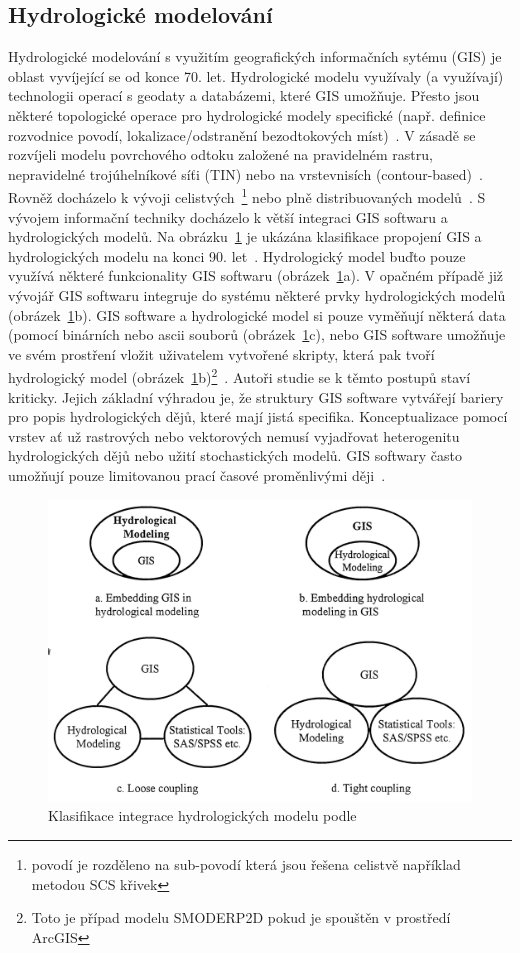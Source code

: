 \subsection*{Hydrologické modelování}
Hydrologické modelování s využitím geografických informačních sytému (GIS) je oblast vyvíjející se od konce 70. let. Hydrologické modelu využívaly (a využívají) technologii operací s geodaty a databázemi, které GIS umožňuje. Přesto jsou některé topologické operace pro hydrologické modely specifické (např. definice rozvodnice povodí, lokalizace/odstranění bezodtokových míst)~\citep{devantier1993}. V zásadě se rozvíjeli modelu povrchového odtoku založené na pravidelném rastru, nepravidelné trojúhelníkové síťi (TIN) nebo na vrstevnisích (contour-based)~\citep{devantier1993}. Rovněž docházelo k vývoji celistvých~\footnote{povodí je rozděleno na sub-povodí která jsou řešena celistvě například metodou SCS křivek} nebo plně distribuovaných modelů~\citep{devantier1993}. S vývojem informační techniky docházelo k větší integraci GIS softwaru a hydrologických modelů. Na obrázku~\ref{fig:klasGISHyd} je ukázána klasifikace propojení GIS a hydrologických modelu na konci 90. let~\citep{sui1999}. Hydrologický model buďto pouze využívá některé funkcionality GIS softwaru (obrázek~\ref{fig:klasGISHyd}a). V opačném případě již vývojář GIS softwaru integruje do systému některé prvky hydrologických modelů (obrázek~\ref{fig:klasGISHyd}b). GIS software a hydrologické model si pouze vyměňují některá data (pomocí binárních nebo ascii souborů (obrázek~\ref{fig:klasGISHyd}c), nebo GIS software umožňuje ve svém prostření vložit uživatelem vytvořené skripty, která pak tvoří hydrologický model (obrázek~\ref{fig:klasGISHyd}b)\footnote{Toto je případ modelu SMODERP2D pokud je spouštěn v prostředí ArcGIS}~\citep{sui1999}. Autoři studie se k těmto postupů staví kriticky. Jejich základní výhradou je, že struktury GIS software vytvářejí bariery pro popis hydrologických dějů, které mají jistá specifika. Konceptualizace pomocí vrstev ať už rastrových  nebo vektorových nemusí vyjadřovat heterogenitu hydrologických dějů nebo užití stochastických modelů. GIS softwary často umožňují pouze limitovanou prací časové proměnlivými ději~\citep{sui1999}.

\begin{figure}
  \centering
  \includegraphics[width=0.75\linewidth]{./img/klasifikaceGISHyd.png}
  \caption{Klasifikace integrace hydrologických modelu podle~\cite{sui1999}}
  \label{fig:klasGISHyd}
\end{figure}

